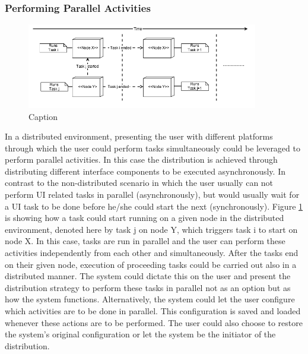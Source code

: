 \subsubsection{Performing Parallel Activities}
\begin{figure}[h]
\includegraphics[width=0.9\textwidth, inner, center]{generic2}
\caption{Caption}
\label{fig:figure32}
\end{figure}
In a distributed environment, presenting the user with different platforms through which the user could perform tasks simultaneously could be leveraged to perform parallel activities. In this case the distribution is achieved through distributing different interface components to be executed asynchronously. In contrast to the non-distributed scenario in which the user usually can not perform UI related tasks in parallel (asynchronously), but would usually wait for a UI task to be done before he/she could start the next (synchronously). Figure \ref{fig:figure32} is showing how a task could start running on a given node in the distributed environment, denoted here by task j on node Y, which triggers task i to start on node X. In this case, tasks are run in parallel and the user can perform these activities independently from each other and simultaneously. After the tasks end on their given node, execution of proceeding tasks could be carried out also in a distributed manner. 
The system could dictate this on the user and present the distribution strategy to perform these tasks in parallel not as an option but as how the system functions. Alternatively, the system could let the user configure which activities are to be done in parallel. This configuration is saved and loaded whenever these actions are to be performed. The user could also choose to restore the system's original configuration or let the system be the initiator of the distribution.
    
